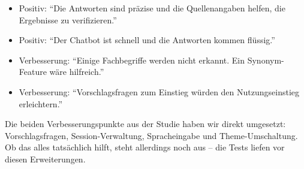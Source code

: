 \begin{itemize}
    \item Positiv: ``Die Antworten sind präzise und die Quellenangaben helfen, die Ergebnisse zu verifizieren.''
    \item Positiv: ``Der Chatbot ist schnell und die Antworten kommen flüssig.''
    \item Verbesserung: ``Einige Fachbegriffe werden nicht erkannt. Ein Synonym-Feature wäre hilfreich.''
    \item Verbesserung: ``Vorschlagsfragen zum Einstieg würden den Nutzungseinstieg erleichtern.''
\end{itemize}

Die beiden Verbesserungspunkte aus der Studie haben wir direkt umgesetzt: Vorschlagsfragen, Session-Verwaltung, Spracheingabe und Theme-Umschaltung. Ob das alles tatsächlich hilft, steht allerdings noch aus -- die Tests liefen vor diesen Erweiterungen.
